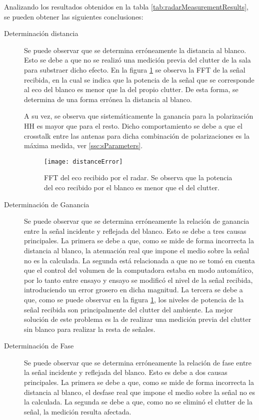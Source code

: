 Analizando los resultados obtenidos en la tabla \ref{tab:radarMeasurementResults}, se pueden obtener las siguientes conclusiones:
\begin{description}
  \item[Determinación distancia] Se puede observar que se determina erróneamente la distancia al blanco. Esto se debe a que no se realizó una medición previa del clutter de la sala para substraer dicho efecto. En la figura \ref{fig:distanceError} se observa la FFT de la señal recibida, en la cual se indica que la potencia de la señal que se corresponde al eco del blanco es menor que la del propio clutter. De esta forma, se determina de una forma errónea la distancia al blanco.

  A su vez, se observa que sistemáticamente la ganancia para la polarización HH es mayor que para el resto. Dicho comportamiento se debe a que el crosstalk entre las antenas para dicha combinación de polarizaciones es la máxima medida, ver \ref{ssc:sParameters}.

  \begin{figure}[H]
    \centering
    \texttt{[image: distanceError]}
    \caption{FFT del eco recibido por el radar. Se observa que la potencia del eco recibido por el blanco es menor que el del clutter.}
    \label{fig:distanceError}
  \end{figure}

  \item[Determinación de Ganancia] Se puede observar que se determina erróneamente la relación de ganancia entre la señal incidente y reflejada del blanco. Esto se debe a tres causas principales. La primera se debe a que, como se mide de forma incorrecta la distancia al blanco, la atenuación real que impone el medio sobre la señal no es la calculada. La segunda está relacionada a que no se tomó en cuenta que el control del volumen de la computadora estaba en modo automático, por lo tanto entre ensayo y ensayo se modificó el nivel de la señal recibida, introduciendo un error grosero en dicha magnitud. La tercera se debe a que, como se puede observar en la figura \ref{fig:distanceError}, los niveles de potencia de la señal recibida son principalmente del clutter del ambiente. La mejor solución de este problema es la de realizar una medición previa del clutter sin blanco para realizar la resta de señales.

  \item[Determinación de Fase] Se puede observar que se determina erróneamente la relación de fase entre la señal incidente y reflejada del blanco. Esto es debe a dos causas principales. La primera se debe a que, como se mide de forma incorrecta la distancia al blanco, el desfase real que impone el medio sobre la señal no es la calculada. La segunda se debe a que, como no se eliminó el clutter de la señal, la medición resulta afectada.
\end{description}


